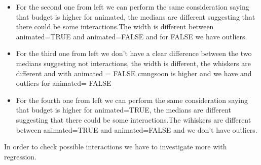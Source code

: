 \documentclass[11pt]{article}
\begin{document}
\begin{itemize}
\item
  For the second one from left we can perform the same consideration
  saying that budget is higher for animated, the medians are different
  suggesting that there could be some interactions.The width is
  different between animated=TRUE and animated=FALSE and for FALSE we
  have outliers.
\item
  For the third one from left we don't have a clear difference between
  the two medians suggesting not interactions, the width is different,
  the whiskers are different and with animated = FALSE cmngsoon is
  higher and we have and outliers for animated= FALSE
\item
  For the fourth one from left we can perform the same consideration
  saying that budget is higher for animated=TRUE, the medians are
  different suggesting that there could be some interactions.The
  wihiskers are different between animated=TRUE and animated=FALSE and
  we don't have outliers.
\end{itemize}

In order to check possible interactions we have to investigate more with
regression.
\end{document}
